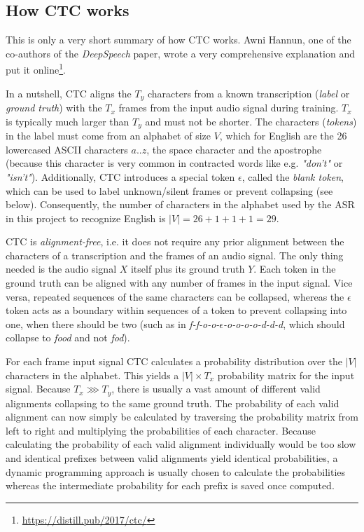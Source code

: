\subsection{How CTC works}
\label{ctc-summary}

This is only a very short summary of how \ac{CTC} works. Awni Hannun, one of the co-authors of the \textit{DeepSpeech} paper, wrote a very comprehensive explanation and put it online\footnote{\url{https://distill.pub/2017/ctc/}}.

In a nutshell, \ac{CTC} aligns the $T_y$ characters from a known transcription (\textit{label} or \textit{ground truth}) with the $T_x$ frames from the input audio signal during training. $T_x$ is typically much larger than $T_y$ and must not be shorter. The characters (\textit{tokens}) in the label must come from an alphabet of size $V$, which for English are the 26 lowercased ASCII characters $a..z$, the space character and the apostrophe (because this character is very common in contracted words like e.g. \textit{"don't"} or \textit{"isn't"}). Additionally, \ac{CTC} introduces a special token $\epsilon$, called the \textit{blank token}, which can be used to label unknown/silent frames or prevent collapsing (see below). Consequently, the number of characters in the alphabet used by the \ac{ASR} in this project to recognize English is $|V|=26+1+1+1=29$.

\ac{CTC} is \textit{alignment-free}, i.e. it does not require any prior alignment between the characters of a transcription and the frames of an audio signal. The only thing needed is the audio signal $X$ itself plus its ground truth $Y$. Each token in the ground truth can be aligned with any number of frames in the input signal. Vice versa, repeated sequences of the same characters can be collapsed, whereas the $\epsilon$ token acts as a boundary within sequences of a token to prevent collapsing into one, when there should be two (such as in \textit{f-f-o-o-$\epsilon$-o-o-o-o-d-d-d}, which should collapse to \textit{food} and not \textit{fod}). 

For each frame input signal \ac{CTC} calculates a probability distribution over the $|V|$ characters in the alphabet. This yields a $|V| \times T_x$ probability matrix for the input signal. Because $T_x \ggg T_y$, there is usually a vast amount of different valid alignments collapsing to the same ground truth. The probability of each valid alignment can now simply be calculated by traversing the probability matrix from left to right and multiplying the probabilities of each character. Because calculating the probability of each valid alignment individually would be too slow and identical prefixes between valid alignments yield identical probabilities, a dynamic programming approach is usually chosen to calculate the probabilities whereas the intermediate probability for each prefix is saved once computed.

